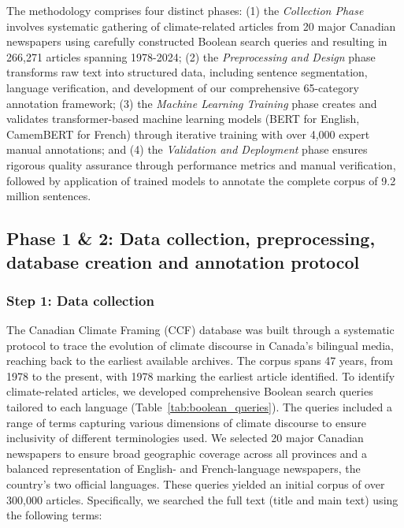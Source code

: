 \documentclass[12pt]{article}
\begin{document}
The methodology comprises four distinct phases: (1) the \emph{Collection Phase} involves systematic gathering of climate-related articles from 20 major Canadian newspapers using carefully constructed Boolean search queries and resulting in 266,271 articles spanning 1978-2024; (2) the \emph{Preprocessing and Design} phase transforms raw text into structured data, including sentence segmentation, language verification, and development of our comprehensive 65-category annotation framework; (3) the \emph{Machine Learning Training} phase creates and validates transformer-based machine learning models (BERT for English, CamemBERT for French) through iterative training with over 4,000 expert manual annotations; and (4) the \emph{Validation and Deployment} phase ensures rigorous quality assurance through performance metrics and manual verification, followed by application of trained models to annotate the complete corpus of 9.2 million sentences.

\subsection{Phase 1 \& 2: Data collection, preprocessing, database creation and annotation protocol}

\subsubsection{Step 1: Data collection}

The Canadian Climate Framing (CCF) database was built through a systematic protocol to trace the evolution of climate discourse in Canada’s bilingual media, reaching back to the earliest available archives. The corpus spans 47 years, from 1978 to the present, with 1978 marking the earliest article identified. To identify climate-related articles, we developed comprehensive Boolean search queries tailored to each language (Table~\ref{tab:boolean_queries}). The queries included a range of terms capturing various dimensions of climate discourse to ensure inclusivity of different terminologies used. We selected 20 major Canadian newspapers to ensure broad geographic coverage across all provinces and a balanced representation of English- and French-language newspapers, the country’s two official languages. These queries yielded an initial corpus of over 300,000 articles. Specifically, we searched the full text (title and main text) using the following terms:
\end{document}
